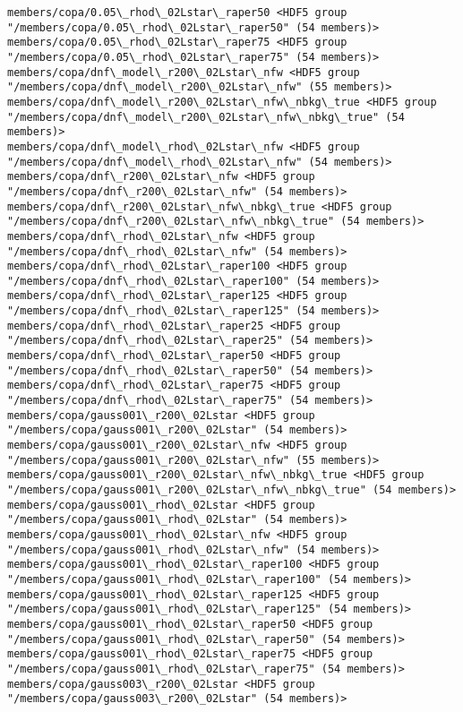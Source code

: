 \documentclass[11pt]{article}
\begin{document}
\begin{Verbatim}[commandchars=\\\{\}]
members/copa/0.05\_rhod\_02Lstar\_raper50 <HDF5 group "/members/copa/0.05\_rhod\_02Lstar\_raper50" (54 members)>
members/copa/0.05\_rhod\_02Lstar\_raper75 <HDF5 group "/members/copa/0.05\_rhod\_02Lstar\_raper75" (54 members)>
members/copa/dnf\_model\_r200\_02Lstar\_nfw <HDF5 group "/members/copa/dnf\_model\_r200\_02Lstar\_nfw" (55 members)>
members/copa/dnf\_model\_r200\_02Lstar\_nfw\_nbkg\_true <HDF5 group "/members/copa/dnf\_model\_r200\_02Lstar\_nfw\_nbkg\_true" (54 members)>
members/copa/dnf\_model\_rhod\_02Lstar\_nfw <HDF5 group "/members/copa/dnf\_model\_rhod\_02Lstar\_nfw" (54 members)>
members/copa/dnf\_r200\_02Lstar\_nfw <HDF5 group "/members/copa/dnf\_r200\_02Lstar\_nfw" (54 members)>
members/copa/dnf\_r200\_02Lstar\_nfw\_nbkg\_true <HDF5 group "/members/copa/dnf\_r200\_02Lstar\_nfw\_nbkg\_true" (54 members)>
members/copa/dnf\_rhod\_02Lstar\_nfw <HDF5 group "/members/copa/dnf\_rhod\_02Lstar\_nfw" (54 members)>
members/copa/dnf\_rhod\_02Lstar\_raper100 <HDF5 group "/members/copa/dnf\_rhod\_02Lstar\_raper100" (54 members)>
members/copa/dnf\_rhod\_02Lstar\_raper125 <HDF5 group "/members/copa/dnf\_rhod\_02Lstar\_raper125" (54 members)>
members/copa/dnf\_rhod\_02Lstar\_raper25 <HDF5 group "/members/copa/dnf\_rhod\_02Lstar\_raper25" (54 members)>
members/copa/dnf\_rhod\_02Lstar\_raper50 <HDF5 group "/members/copa/dnf\_rhod\_02Lstar\_raper50" (54 members)>
members/copa/dnf\_rhod\_02Lstar\_raper75 <HDF5 group "/members/copa/dnf\_rhod\_02Lstar\_raper75" (54 members)>
members/copa/gauss001\_r200\_02Lstar <HDF5 group "/members/copa/gauss001\_r200\_02Lstar" (54 members)>
members/copa/gauss001\_r200\_02Lstar\_nfw <HDF5 group "/members/copa/gauss001\_r200\_02Lstar\_nfw" (55 members)>
members/copa/gauss001\_r200\_02Lstar\_nfw\_nbkg\_true <HDF5 group "/members/copa/gauss001\_r200\_02Lstar\_nfw\_nbkg\_true" (54 members)>
members/copa/gauss001\_rhod\_02Lstar <HDF5 group "/members/copa/gauss001\_rhod\_02Lstar" (54 members)>
members/copa/gauss001\_rhod\_02Lstar\_nfw <HDF5 group "/members/copa/gauss001\_rhod\_02Lstar\_nfw" (54 members)>
members/copa/gauss001\_rhod\_02Lstar\_raper100 <HDF5 group "/members/copa/gauss001\_rhod\_02Lstar\_raper100" (54 members)>
members/copa/gauss001\_rhod\_02Lstar\_raper125 <HDF5 group "/members/copa/gauss001\_rhod\_02Lstar\_raper125" (54 members)>
members/copa/gauss001\_rhod\_02Lstar\_raper50 <HDF5 group "/members/copa/gauss001\_rhod\_02Lstar\_raper50" (54 members)>
members/copa/gauss001\_rhod\_02Lstar\_raper75 <HDF5 group "/members/copa/gauss001\_rhod\_02Lstar\_raper75" (54 members)>
members/copa/gauss003\_r200\_02Lstar <HDF5 group "/members/copa/gauss003\_r200\_02Lstar" (54 members)>

\end{Verbatim}
\end{document}

